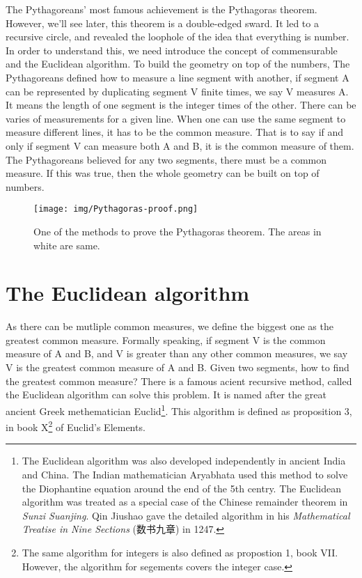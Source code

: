 \documentclass{article}
\begin{document}
The Pythagoreans' most famous achievement is the Pythagoras theorem. However, we'll see later, this theorem is a double-edged sward. It led to a recursive circle, and revealed the loophole of the idea that everything is number. In order to understand this, we need introduce the concept of commensurable and the Euclidean algorithm. To build the geometry on top of the numbers, The Pythagoreans defined how to measure a line segment with another, if segment A can be represented by duplicating segment V finite times, we say V measures A. It means the length of one segment is the integer times of the other. There can be varies of measurements for a given line. When one can use the same segment to measure different lines, it has to be the common measure. That is to say if and only if segment V can measure both A and B, it is the common measure of them. The Pythagoreans believed for any two segments, there must be a common measure. If this was true, then the whole geometry can be built on top of numbers.

\begin{figure}[htbp]
 \centering
 \texttt{[image: img/Pythagoras-proof.png]}
 \caption{One of the methods to prove the Pythagoras theorem. The areas in white are same.}
 \label{fig:Pythagoras-proof}
\end{figure}

\section{The Euclidean algorithm}

As there can be mutliple common measures, we define the biggest one as the greatest common measure. Formally speaking, if segment V is the common measure of A and B, and V is greater than any other common measures, we say V is the greatest common measure of A and B. Given two segments, how to find the greatest common measure? There is a famous acient recursive method, called the Euclidean algorithm can solve this problem. It is named after the great ancient Greek methematician Euclid\footnote{The Euclidean algorithm was also developed independently in ancient India and China. The Indian mathematician Aryabhata used this method to solve the Diophantine equation around the end of the 5th centry. The Euclidean algorithm was treated as a special case of the Chinese remainder theorem in {\em Sunzi Suanjing}. Qin Jiushao gave the detailed algorithm in his {\em Mathematical Treatise in Nine Sections} (数书九章) in 1247.}. This algorithm is defined as proposition 3, in book X\footnote{The same algorithm for integers is also defined as propostion 1, book VII. However, the algorithm for segements covers the integer case.} of Euclid's Elements\cite{Elements}.
\end{document}
